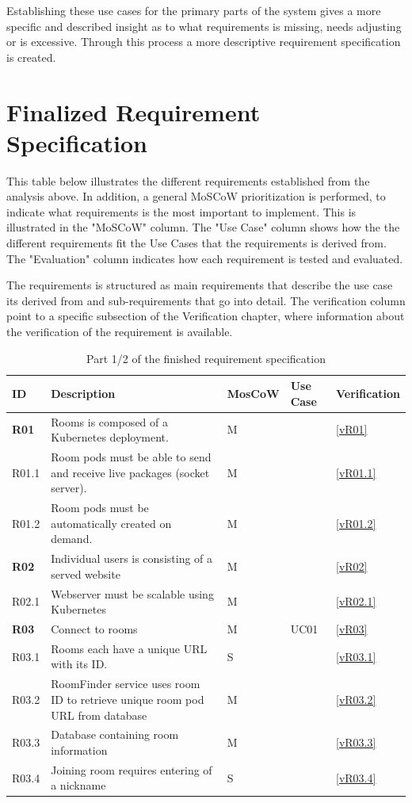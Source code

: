 Establishing these use cases for the primary parts of the system gives a more specific and described insight as to what requirements is missing, needs adjusting or is excessive. Through this process a more descriptive requirement specification is created. 

\section{Finalized Requirement Specification}
This table below illustrates the different requirements established from the analysis above. In addition, a general MoSCoW prioritization is performed, to indicate what requirements is the most important to implement. This is illustrated in the "MoSCoW" column. The "Use Case" column shows how the the different requirements fit the Use Cases that the requirements is derived from. The "Evaluation" column indicates how each requirement is tested and evaluated. 

The requirements is structured as main requirements that describe the use case its derived from and sub-requirements that go into detail. The verification column point to a specific subsection of the Verification chapter, where information about the verification of the requirement is available.

\begin{table}[h]
\begin{tabularx}{\textwidth}{|l|X|l|l|l|}
\hline
ID  & Description & MosCoW & Use Case & Verification \\ \hline\hline
\textbf{R01} & Rooms is composed of a Kubernetes deployment. & M & & \ref{vR01} \\ \hline
R01.1 & Room pods must be able to send and receive live packages (socket server). & M & & \ref{vR01.1}       \\ \hline
R01.2 & Room pods must be automatically created on demand. & M & & \ref{vR01.2}         \\ \hline
\textbf{R02} & Individual users is consisting of a served website & M & & \ref{vR02}      \\ \hline
R02.1 & Webserver must be scalable using Kubernetes & M & & \ref{vR02.1}      \\ \hline
\textbf{R03} & Connect to rooms & M & UC01 & \ref{vR03}      \\ \hline
R03.1 & Rooms each have a unique URL with its ID. & S & & \ref{vR03.1}     \\ \hline
R03.2 & RoomFinder service uses room ID to retrieve unique room pod URL from database & M & & \ref{vR03.2}      \\ \hline
R03.3 & Database containing room information & M & & \ref{vR03.3}      \\ \hline
R03.4 & Joining room requires entering of a nickname & S & & \ref{vR03.4}      \\ \hline
\end{tabularx}
\caption{Part 1/2 of the finished requirement specification}
\label{tab:risks}
\end{table}

